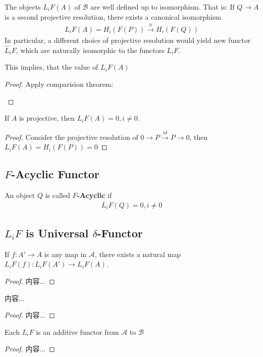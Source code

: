 \documentclass[Total.tex]{subfiles}
\begin{document}
			\begin{lemma}
				The objects $L_i F(A)$ of $\mathcal{B}$ are well defined up to isomorphism. That is: If $Q\rightarrow A$ is a second projective resolution, there exists a canonical isomorphism
				\begin{gather*}
					L_i F(A)=H_i(F(P))\stackrel{\cong}{\rightarrow} H_i(F(Q))
				\end{gather*}
				In particular, a different choice of projective resolution would yield new functor $\hat{L}_i F$, which are naturally isomorphic to the functors $L_iF$.
				\end{lemma}
				This implies, that the value of $L_iF(A)$
				\begin{proof}
					Apply comparision theorem:
					\begin{center}
					\end{center}
				\end{proof}
			\begin{corollary}
				If $A$ is projective, then $L_i F(A)=0,i\not=0$.
			\end{corollary}
			\begin{proof}
				Consider the projective resolution of $0\rightarrow P\stackrel{id}{\rightarrow} P\rightarrow 0$, then$L_iF(A)=H_i(F(P))=0$
			\end{proof}
			\subsection{$F$-Acyclic Functor}
			\begin{Def}
				An object $Q$ is called \textbf{$F$-Acyclic} if 
				\begin{gather*}
					L_iF(Q)=0,i\not=0
				\end{gather*}
			\end{Def}
			\subsection{$L_iF$ is Universal $\delta$-Functor}
			\begin{lemma}
				If $f:A'\rightarrow A$ is any map in $\mathcal{A}$, there exists a natural map $L_iF(f):L_iF(A')\rightarrow L_iF(A)$. 
			\end{lemma}
			\begin{proof}
				内容...
			\end{proof}
			\begin{proposition}
				内容...
			\end{proposition}
			\begin{proof}
				内容...
			\end{proof}
			\begin{theorem}
				Each $L_iF$ is an additive functor from $\mathcal{A}$ to $\mathcal{B}$
			\end{theorem}
			\begin{proof}
				内容...
			\end{proof}
			
\end{document}
